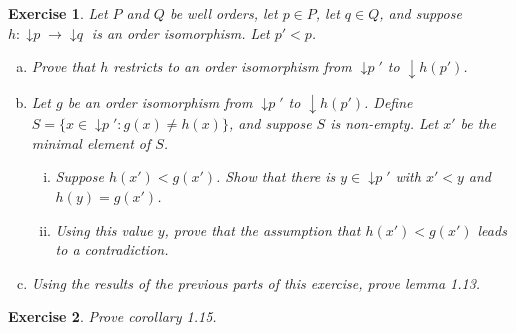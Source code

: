 \documentclass{article}
\theoremstyle{plain}
\newtheorem{Q}{Exercise}{\bfseries}{\upshape}
\DeclareMathOperator{\ISp}{\downarrow \mathit{p}}
\DeclareMathOperator{\ISq}{\downarrow \mathit{q}}
\begin{document}
\begin{Q}\label{Q:isom}
Let $P$ and $Q$ be well orders, let $p\in P$, let $q\in Q$, and suppose $h:\ISp \to \ISq$ is an order isomorphism. Let $p'< p$.
\begin{enumerate}[(a)]
\item Prove that $h$ restricts to an order isomorphism from $\ISp'$ to $\downarrow h(p')$.
\item Let $g$ be an order isomorphism from $\ISp'$ to $\downarrow h(p')$. Define $S = \{x\in \ISp' : g(x)\neq h(x)\}$, and suppose $S$ is non-empty. Let $x'$ be the minimal element of $S$.
\begin{enumerate}[(i)]
\item Suppose $h(x')< g(x')$. Show that there is $y\in \ISp'$ with $x' < y$ and $h(y) = g(x')$. 
\item Using this value $y$, prove that the assumption that $h(x')< g(x')$ leads to a contradiction. 
\end{enumerate}
\item Using the results of the previous parts of this exercise, prove lemma 1.13.
\end{enumerate}
\end{Q}
\begin{comment}
\textbf{Solution:}
Clearly $h$ restricts to an order isomorphism as required, so all we must do is prove that this is only such order isomorphism. So let $g$ be an order isomorphism from $\ISp'$ to $\downarrow h(p')$, and suppose $\{x\in \ISp' : g(x)\neq h(x)\}\neq \emptyset$. Then, by the well ordering property, there is a least $x\in \ISp'$ such that $h(x)\neq g(x)$. Suppose $h(x)< g(x)$. Then, as $g$ is an order isomorphism, there must be $y\in P$ with $g(y) = h(x)$, and $y< x$. But then, by minimality of $x$, we must have $g(y)=h(y)\neq h(x)$, as $h$ is also an order isomorphism. This is, of course, a contradiction. If $g(x)< h(x)$ then we can make a similar argument.  
\end{comment}

\begin{Q}\label{Q:c}
Prove corollary 1.15.
\end{Q}
\begin{comment}
\textbf{Solution:}

\end{comment}
\end{document}
